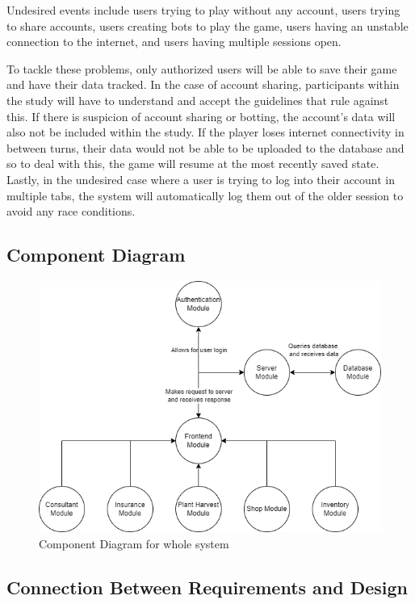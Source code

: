 \documentclass[12pt, titlepage]{article}
\begin{document}
Undesired events include users trying to play without any account, users trying to share accounts, users creating bots to play the game, users having an unstable connection to the internet, and users having multiple sessions open.

 To tackle these problems, only authorized users will be able to save their game and have their data tracked. In the case of account sharing, participants within the study will have to understand and accept the guidelines that rule against this. If there is suspicion of account sharing or botting, the account's data will also not be included within the study. If the player loses internet connectivity in between turns, their data would not be able to be uploaded to the database and so to deal with this, the game will resume at the most recently saved state. Lastly, in the undesired case where a user is trying to log into their account in multiple tabs, the system will automatically log them out of the older session to avoid any race conditions.

 

\subsection{Component Diagram}

\begin{figure}[H]
\centering
\includegraphics[width=1\textwidth]{component.png}
\caption{Component Diagram for whole system}
\label{FigUH}
\end{figure}

\subsection{Connection Between Requirements and Design} \label{SecConnection}
\end{document}
